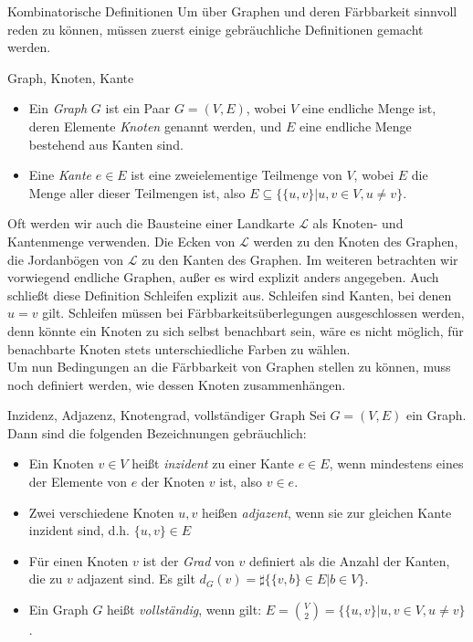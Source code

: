 \begin{section}{Kombinatorische Definitionen}
  Um über Graphen und deren Färbbarkeit sinnvoll reden zu können, müssen zuerst einige gebräuchliche Definitionen gemacht werden. 
 
  \begin{definition}{Graph, Knoten, Kante}
    \-\ 
    \begin{itemize}
    \item Ein \textit{Graph} $G$ ist ein Paar $G=(V,E)$, wobei $V$ eine endliche Menge ist, deren Elemente \textit{Knoten} genannt werden, und $E$ eine endliche Menge bestehend aus Kanten sind.
    \item Eine \textit{Kante} $e \in E$ ist eine zweielementige Teilmenge von $V$, wobei $E$ die Menge aller dieser Teilmengen ist, also $E \subseteq \{\{u,v\}|u,v \in V, u \neq v\}$.
    \end{itemize}
  \end{definition}
  
  Oft werden wir auch die Bausteine einer Landkarte $\mathcal{L}$ als Knoten- und Kantenmenge verwenden. Die Ecken von $\mathcal{L}$ werden zu den Knoten des Graphen, die Jordanbögen von $\mathcal{L}$ zu den Kanten des Graphen. Im weiteren betrachten wir vorwiegend endliche Graphen, außer es wird explizit anders angegeben. Auch schließt diese Definition Schleifen explizit aus. Schleifen sind Kanten, bei denen $u=v$ gilt. Schleifen müssen bei Färbbarkeitsüberlegungen ausgeschlossen werden, denn könnte ein Knoten zu sich selbst benachbart sein, wäre es nicht möglich, für benachbarte Knoten stets unterschiedliche Farben zu wählen.\\
  Um nun Bedingungen an die Färbbarkeit von Graphen stellen zu können, muss noch definiert werden, wie dessen Knoten zusammenhängen.
 
  \begin{definition}{Inzidenz, Adjazenz, Knotengrad, vollständiger Graph}
    Sei $G=(V,E)$ ein Graph. Dann sind die folgenden Bezeichnungen gebräuchlich:
    \begin{itemize}
    \item Ein Knoten $v \in V$ heißt \textit{inzident} zu einer Kante $e \in E$, wenn mindestens eines der Elemente von $e$ der Knoten $v$ ist, also $v \in e$. 
    \item Zwei verschiedene Knoten $u,v$ heißen \textit{adjazent}, wenn sie zur gleichen Kante inzident sind, d.h. $\{u,v\}\in E$
    \item Für einen Knoten $v$ ist der \textit{Grad} von $v$ definiert als die Anzahl der Kanten, die zu $v$ adjazent sind. Es gilt $d_G(v) = \sharp\{\{v,b\} \in E | b\in V\}$.
    \item Ein Graph $G$ heißt \textit{vollständig}, wenn gilt: $E = \binom{V}{2} = \{\{u,v\}|u,v \in V, u \neq v\}$.
   \end{itemize}
  \end{definition}
    

\end{section}
